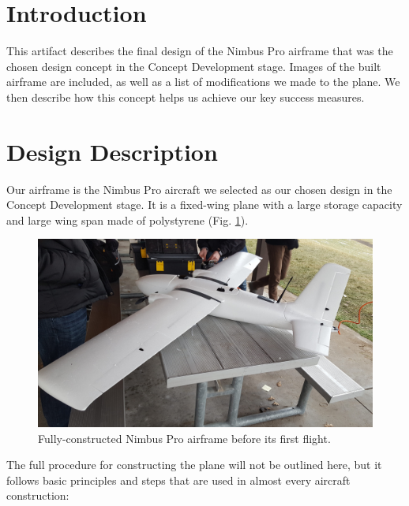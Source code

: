 \documentclass[]{auvsi_doc}
\begin{document}
\begin{AUVSITitlePage}
\begin{artifacttable}
\end{artifacttable}
\end{AUVSITitlePage}

\section{Introduction}
This artifact describes the final design of the Nimbus Pro airframe that was the chosen design concept in the Concept Development stage. Images of the built airframe are included, as well as a list of modifications we made to the plane. We then describe how this concept helps us achieve our key success measures.

\section{Design Description}
Our airframe is the Nimbus Pro aircraft we selected as our chosen design in the Concept Development stage. It is a fixed-wing plane with a large storage capacity and large wing span made of polystyrene (Fig. \ref{fig:plane1}).

\begin{figure}[h!]
	\centering
	\includegraphics[width=.9\columnwidth]{figs/plane1}
	\caption{Fully-constructed Nimbus Pro airframe before its first flight.}
	\label{fig:plane1}
\end{figure} 

The full procedure for constructing the plane will not be outlined here, but it follows basic principles and steps that are used in almost every aircraft construction:
\end{document}
